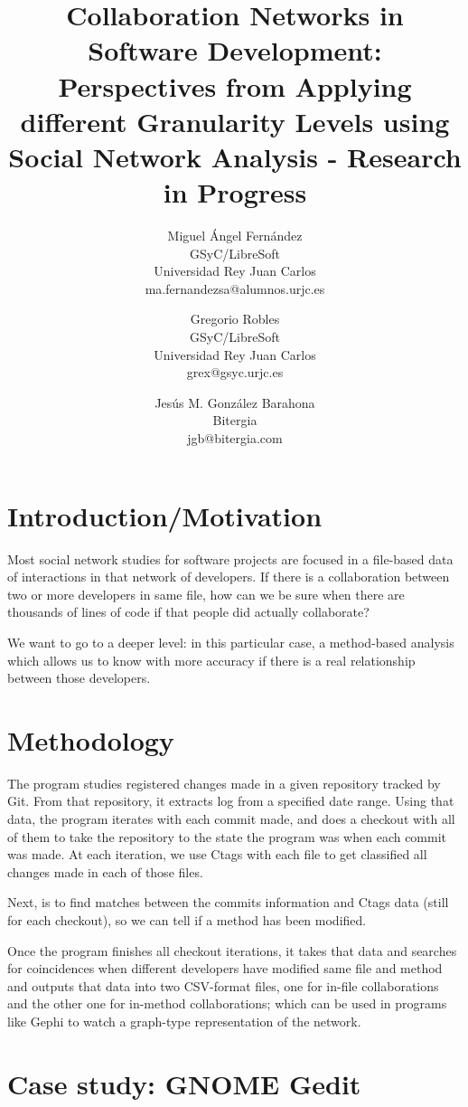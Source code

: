 \documentclass[a4paper]{article}
\title{Collaboration Networks in Software Development: Perspectives from Applying different Granularity Levels using Social Network Analysis - Research in Progress}
\author{
Miguel Ángel Fernández \\ GSyC/LibreSoft \\
                Universidad Rey Juan Carlos \\ ma.fernandezsa@alumnos.urjc.es
\and
Gregorio Robles \\ GSyC/LibreSoft \\
                Universidad Rey Juan Carlos \\ grex@gsyc.urjc.es
\and
Jesús M. González Barahona \\ Bitergia \\
                jgb@bitergia.com
}
\begin{document}
\maketitle

\vskip 32pt


\section{Introduction/Motivation}

Most social network studies for software projects are focused in a file-based
data of interactions in that network of developers. If there is a
collaboration between two or more developers in same file, how can we be sure
when there are thousands of lines of code if that people did actually
collaborate?

We want to go to a deeper level: in this particular case, a method-based
analysis which allows us to know with more accuracy if there is a real
relationship between those developers.

\section{Methodology}

The program studies registered changes made in a given repository tracked by
Git. From that repository, it extracts log from a specified date range. Using
that data, the program iterates with each commit made, and does a checkout
with all of them to take the repository to the state the program was when each
commit was made. At each iteration, we use Ctags with each file to get
classified all changes made in each of those files.

Next, is to find matches
between the commits information and Ctags data (still for each checkout), so
we can tell if a method has been modified.

Once the program finishes all checkout iterations, it takes that data and
searches for coincidences when different developers have modified same file
and method and outputs that data into two CSV-format files, one for in-file
collaborations and the other one for in-method collaborations; which can be
used in programs like Gephi to watch a graph-type representation of the
network.

\section{Case study: GNOME Gedit}
\end{document}
